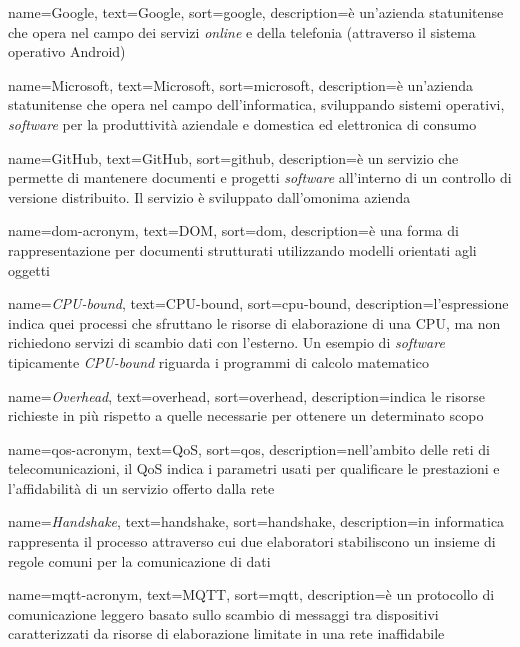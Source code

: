 {
  name=Google,
  text=Google,
  sort=google,
  description={è un'azienda statunitense che opera nel campo dei servizi \emph{online} e della telefonia (attraverso il sistema operativo Android)}
}

{
  name=Microsoft,
  text=Microsoft,
  sort=microsoft,
  description={è un'azienda statunitense che opera nel campo dell'informatica, sviluppando sistemi operativi, \emph{software} per la produttività aziendale e domestica ed elettronica di consumo}
}

{
  name=GitHub,
  text=GitHub,
  sort=github,
  description={è un servizio che permette di mantenere documenti e progetti \emph{software} all'interno di un controllo di versione distribuito. Il servizio è sviluppato dall'omonima azienda}
}

{
  name=\gls{dom-acronym},
  text=DOM,
  sort=dom,
  description={è una forma di rappresentazione per documenti strutturati utilizzando modelli orientati agli oggetti}
}

{
  name=\emph{CPU-bound},
  text=CPU-bound,
  sort=cpu-bound,
  description={l'espressione indica quei processi che sfruttano le risorse di elaborazione di una CPU, ma non richiedono servizi di scambio dati con l'esterno. Un esempio di \emph{software} tipicamente \emph{CPU-bound} riguarda i programmi di calcolo matematico}
}

{
  name=\emph{Overhead},
  text=overhead,
  sort=overhead,
  description={indica le risorse richieste in più rispetto a quelle necessarie per ottenere un determinato scopo}
}

{
  name=\gls{qos-acronym},
  text=QoS,
  sort=qos,
  description={nell'ambito delle reti di telecomunicazioni, il QoS indica i parametri usati per qualificare le prestazioni e l'affidabilità di un servizio offerto dalla rete}
}

{
  name=\emph{Handshake},
  text=handshake,
  sort=handshake,
  description={in informatica rappresenta il processo attraverso cui due elaboratori stabiliscono un insieme di regole comuni per la comunicazione di dati}
}

{
  name=\gls{mqtt-acronym},
  text=MQTT,
  sort=mqtt,
  description={è un protocollo di comunicazione leggero basato sullo scambio di messaggi tra dispositivi caratterizzati da risorse di elaborazione limitate in una rete inaffidabile}
}